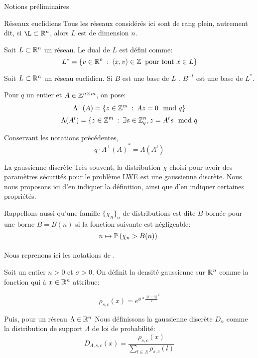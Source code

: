 \begin{section}{Notions préliminaires}
\begin{subsection}{Réseaux euclidiens}
	Tous les réseaux considérés ici sont de rang plein, autrement dit, 
	si $\L \subset \RR^n$, alors $L$ est de dimension $n$.

	\begin{definition}
	Soit $L\subset \mathbb{R}^n$ un réseau. Le dual de $L$ est 
	défini comme:
	\[ L^* = \{ v \in \mathbb{R}^n \::\: \langle x, v \rangle \in \mathbb{Z}
	   \:\text{ pour tout } x\in L\} \]
	\end{definition}
	\begin{prop} 
	Soit $L \subset \mathbb{R}^n$ un réseau euclidien.
	Si $B$ est une base de $L$ .
	$B^{-t}$ est une base de $L^*$.
	\end{prop}

	Pour $q$ un entier et $A \in \mathbb{Z}^{n\times m}$, on pose:
		\[\Lambda^\bot(A) = \{ z \in \mathbb{Z}^m\: :\: A z  = 0 \mod q \}\] 
	\[\Lambda(A^t) = \{ z \in \mathbb{Z}^m\: : \: \exists s\in \mathbb{Z}_q^n, 
	z = A^t s \mod q\]

		\begin{prop} \label{lambda_reseau}
	Conservant les notations précédentes, 
	\[q \cdot {\Lambda^\bot(A)}^* =  \Lambda(A^t)\] 
	\end{prop}
	\end{subsection}
	\begin{subsection}{La gaussienne discrète}
	Très souvent, la distribution $\chi$ choisi pour avoir 
	des paramètres sécurités pour le problème LWE est
	une gaussienne discrète. Nous nous proposons ici 
	d'en indiquer la définition, ainsi que d'en indiquer 
	certaines propriétés.

	Rappellons aussi qu'une famille $\{\chi_n\}_n$
	de distributions est dite $B$-bornée pour une borne 
	$B = B(n)$ si la fonction suivante est négligeable:
		\[n \mapsto \PP\left(\chi_n > B(n)\right) \]

	\paragraph{}
	Nous reprenons ici les notations de \cite{STOC:GenPeiVai08}.

	Soit un entier $n > 0$  et $\sigma > 0$. On définit la densité
	gaussienne sur $\mathbb{R}^n$ comme la fonction qui à $x\in\mathbb{R}^n$
	attribue:

	\[\rho_{s,c}(x) = e^{\phi * {\frac{||x-c||}{s}}^2} \]

	Puis, pour un réseau $\Lambda \in \mathbb{R}^n$ Nous définissons la gaussienne discrète
	$D_\alpha$ comme la distribution de support $\Lambda$ de loi de
	probabilité: 	
	\[ D_{\Lambda, s, c}(x) = \frac{\rho_{s,c}(x)}{\sum_{l\in \Lambda}\rho_{s,c}(l)}\]


\end{subsection}
\end{section}
